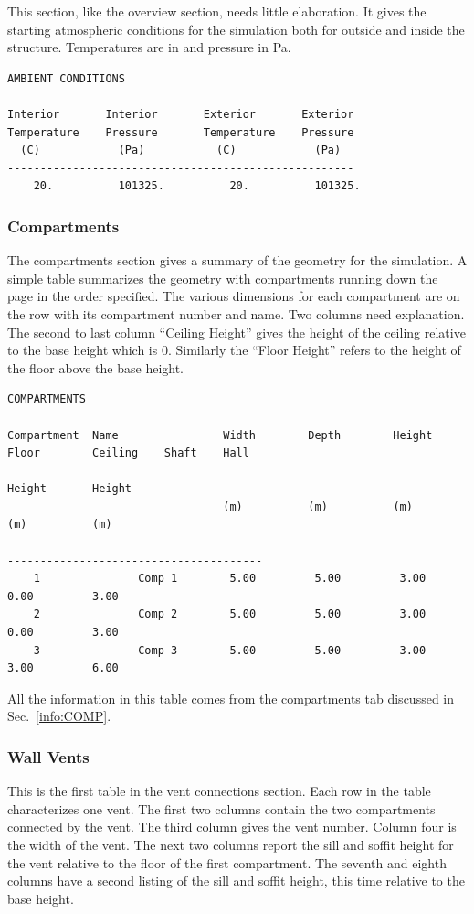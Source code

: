 This section, like the overview section, needs little elaboration.  It gives the starting atmospheric conditions for the simulation both for outside and inside the structure. Temperatures are in \degc and pressure in Pa.
\begin{lstlisting}[basicstyle=\tiny]
AMBIENT CONDITIONS

Interior       Interior       Exterior       Exterior
Temperature    Pressure       Temperature    Pressure
  (C)            (Pa)           (C)            (Pa)
-----------------------------------------------------
    20.          101325.          20.          101325.
\end{lstlisting}

\subsubsection{Compartments}
The compartments section gives a summary of the geometry for the simulation.  A simple table summarizes the geometry with compartments running down the page in the order specified.  The various dimensions for each compartment are on the row with its compartment number and name.  Two columns need explanation.  The second to last column ``Ceiling Height'' gives the height of the ceiling relative to the base height which is 0.  Similarly the ``Floor Height'' refers to the height of the floor above the base height.

\begin{lstlisting}[basicstyle=\tiny]
COMPARTMENTS

Compartment  Name                Width        Depth        Height       Floor        Ceiling    Shaft    Hall
                                                                        Height       Height
                                 (m)          (m)          (m)          (m)          (m)
-------------------------------------------------------------------------------------------------------------
    1               Comp 1        5.00         5.00         3.00         0.00         3.00
    2               Comp 2        5.00         5.00         3.00         0.00         3.00
    3               Comp 3        5.00         5.00         3.00         3.00         6.00
\end{lstlisting}
All the information in this table comes from the compartments tab discussed in Sec.~\ref{info:COMP}.


\subsubsection{Wall Vents}
This is the first table in the vent connections section.  Each row in the table characterizes one vent.  The first two columns contain the two compartments connected by the vent. The third column gives the vent number.  Column four is the width of the vent.  The next two columns report the sill and soffit height for the vent relative to the floor of the first compartment.  The seventh and eighth columns have a second listing of the sill and soffit height, this time relative to the base height.

